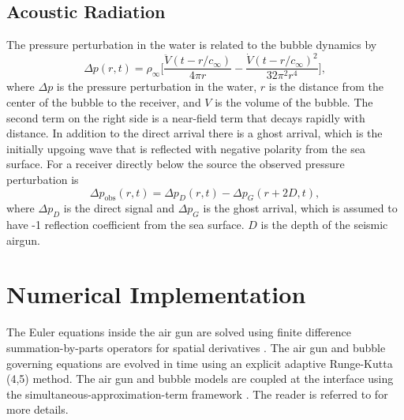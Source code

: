 \documentclass[10pt]{article}
\begin{document}
\subsection{Acoustic Radiation}
The pressure perturbation in the water is related to the bubble dynamics by \citep{Keller1956}
\begin{equation}
\Delta p(r,t) = \rho_\infty \bigg[ \frac{\ddot{V}(t-r/c_\infty)}{4\pi r} - \frac{\dot{V}(t-r/c_\infty)^2}{32\pi^2r^4} \bigg],
\label{eq:acoustic radiation}
\end{equation}
where $\Delta p$ is the pressure perturbation in the water, $r$ is the distance from the center of the bubble to the receiver, and $V$ is the volume of the bubble. The second term on the right side is a near-field term that decays rapidly with distance. In addition to the direct arrival there is a ghost arrival, which is the initially upgoing wave that is reflected with negative polarity from the sea surface. For a receiver directly below the source the observed pressure perturbation is
\begin{equation}
\Delta p_\text{obs}(r,t) = \Delta p_D(r,t) - \Delta p_G(r+2D,t),
\end{equation}
where $\Delta p_D$ is the direct signal and $\Delta p_G$ is the ghost arrival, which is assumed to have -1 reflection coefficient from the sea surface. $D$ is the depth of the seismic airgun.

\section{Numerical Implementation}
The Euler equations inside the air gun are solved using finite difference summation-by-parts operators for spatial derivatives \citep{Svard2014}. The air gun and bubble governing equations are evolved in time using an explicit adaptive Runge-Kutta (4,5) method. The air gun and bubble models are coupled at the interface using the simultaneous-approximation-term framework \citep{Carpenter1994,DelReyFernandez2014a,Svard2014}.
The reader is referred to \citet{Watson2019_airgun} for more details.



\newpage


\end{document}
